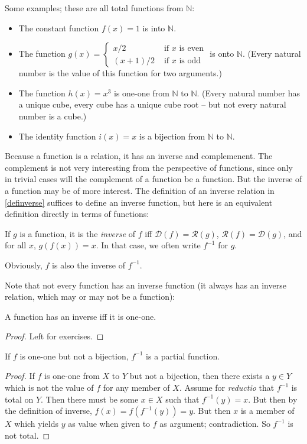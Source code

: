 Some examples; these are all total functions from $\mathbb{N}$: \begin{itemize}
	\item The constant function $f(x) = 1$ is into $\mathbb{N}$.
	\item The function $g(x) = \begin{cases}
		x/2 &\text{ if $x$ is even}\\ (x+1)/2 &\text{ if $x$ is odd} \end{cases}$ is onto $\mathbb{N}$. (Every natural number is the value of this function for two arguments.)
	\item The function $h(x)=x^3$ is one-one from  $\mathbb{N}$ to $\mathbb{N}$. (Every natural number has a unique cube, every cube has a unique cube root – but not every natural number is a cube.)
 	\item The identity function $i(x) = x$ is a bijection from  $\mathbb{N}$ to $\mathbb{N}$.
\end{itemize}

Because a function is a relation, it has an inverse and complemenent. The complement is not very interesting from the perspective of functions, since only in trivial cases will the complement of a function be a function. But the inverse of a function may be of more interest. The definition of an inverse relation in \autoref{definverse} suffices to define an inverse function, but here is an equivalent definition directly in terms of functions: 
\begin{definition}[Inverse] If $g$ is a function, it is the \emph{inverse} of $f$ iff  $\mathcal{D}(f)=\mathcal{R}(g)$, $\mathcal{R}(f)=\mathcal{D}(g)$, and for all $x$, $g(f(x))=x$. In that case, we often write $f^{-1}$ for $g$.
 \end{definition} Obviously, $f$ is also the inverse of $f^{-1}$. 

Note that not every function has an inverse function (it always has an inverse relation, which may or may not be a function):
\begin{theorem}
	A function has an inverse iff it is one-one. \begin{proof}
    Left for exercises.
  \end{proof}
\end{theorem}
\begin{theorem}
If $f$ is one-one but not a bijection, $f^{-1}$ is a partial function. 
\begin{proof}
If $f$ is one-one from $X$ to $Y$ but not a bijection, then there exists a $y\in Y$ which is not the value of $f$ for any member of $X$. Assume for \emph{reductio} that $f^{-1}$ is total on $Y$. Then there must be some $x \in X$ such that $f^{-1}(y) = x$. But then by the definition of inverse, $f(x) = f(f^{-1}(y)) = y$. But then $x$ is a member of $X$ which yields $y$ as value when given to $f$ as argument; contradiction. So $f^{-1}$ is not total.
\end{proof}
\end{theorem}


